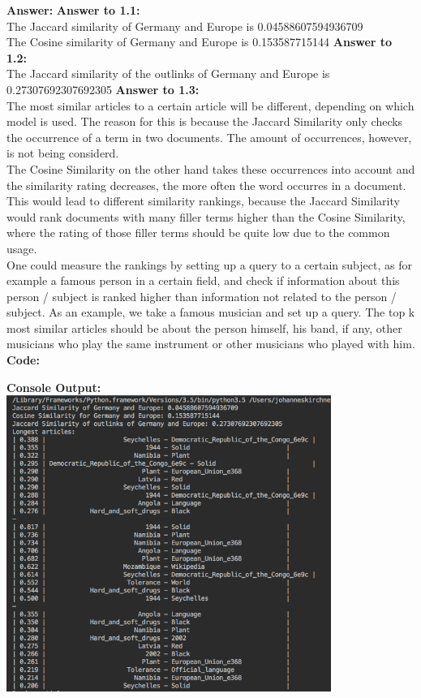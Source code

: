 \documentclass{WeSTassignment}
\begin{document}
\textbf{Answer:}
\textbf{Answer to 1.1:} \\
The Jaccard similarity of Germany and Europe is 0.04588607594936709 \\
The Cosine similarity of Germany and Europe is 0.153587715144
\textbf{Answer to 1.2:} \\
The Jaccard similarity of the outlinks of Germany and Europe is 0.27307692307692305
\textbf{Answer to 1.3:} \\
The most similar articles to a certain article will be different, depending on which model is used. The reason for this is because the Jaccard Similarity only checks the occurrence of a term in two documents. The amount of occurrences, however, is not being considerd.\\
The Cosine Similarity on the other hand takes these occurrences into account and the similarity rating decreases, the more often the word occurres in a document.
This would lead to different similarity rankings, because the Jaccard Similarity would rank documents with many filler terms higher than the Cosine Similarity, where the rating of those filler terms should be quite low due to the common usage.\\
One could measure the rankings by setting up a query to a certain subject, as for example a famous person in a certain field, and check if information about this person / subject is ranked higher than information not related to the person / subject. As an example, we take a famous musician and set up a query. The top k most similar articles should be about the person himself, his band, if any, other musicians who play the same instrument or other musicians who played with him.
\textbf{Code:}

\textbf{Console Output:}\\
\includegraphics[width=400px]{console_01}\\
\end{document}
